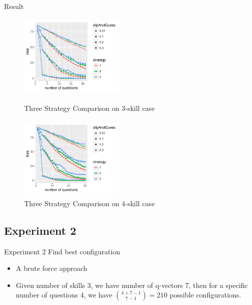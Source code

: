 \documentclass[handout]{beamer}
\begin{document}
\begin{frame}{Result}
	\begin{figure}
		\begin{minipage}[b]{0.45\linewidth}
			\centering
			\includegraphics[width=5cm, height=4cm]{Figures/LossStrategyComparisonThreeSkills.pdf}
			\caption{Three Strategy Comparison on 3-skill case}
			\label{fig:Str-1}
		\end{minipage}
		\hfill
	    \begin{minipage}[b]{0.45\linewidth}
	    	\centering
			\includegraphics[width=5cm, height=4cm]{Figures/LossStrategyComparisonFourSkills.pdf}
			\caption{Three Strategy Comparison on 4-skill case}
			\label{fig:Str-2}
	    \end{minipage}
	\end{figure}
\end{frame}

\subsection{Experiment 2}
\begin{frame}{Experiment 2}
Find best configuration
\begin{itemize}
\item{A brute force approach}
\item{Given number of skills 3, we have number of q-vectors 7, then for a specific number of questions 4, we have ${{4+7-1}\choose {7-1}}=210$ possible configurations.}
\end{itemize}
\end{frame}
\end{document}
